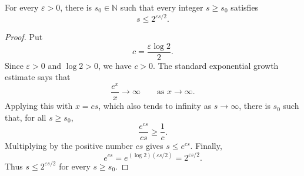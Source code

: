 \begin{helper}
For every \(\varepsilon>0\), there is \(s_0\in\mathbb N\) such that every
integer \(s\ge s_0\) satisfies
\[
  s\le 2^{\varepsilon s/2}.
\]
\end{helper}
\begin{proof}
Put
\[
  c=\frac{\varepsilon\log 2}{2}.
\]
Since \(\varepsilon>0\) and \(\log 2>0\), we have \(c>0\). The standard
exponential growth estimate says that
\[
  \frac{e^x}{x}\to\infty
  \qquad\text{as }x\to\infty.
\]
Applying this with \(x=cs\), which also tends to infinity as \(s\to\infty\),
there is \(s_0\) such that, for all \(s\ge s_0\),
\[
  \frac{e^{cs}}{cs}\ge \frac1c.
\]
Multiplying by the positive number \(cs\) gives \(s\le e^{cs}\). Finally,
\[
  e^{cs}
  =
  e^{(\log 2)(\varepsilon s/2)}
  =
  2^{\varepsilon s/2}.
\]
Thus \(s\le2^{\varepsilon s/2}\) for every \(s\ge s_0\).
\end{proof}
